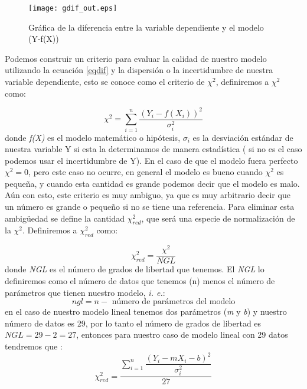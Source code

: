 \documentclass[12pt,letterpaper]{report}
\begin{document}
\begin{figure}
\begin{center}
\texttt{[image: gdif\_out.eps]} 
\caption{Gráfica de la diferencia entre la variable dependiente y el modelo (Y-f(X))}\label{res}
\end{center}
\end{figure}

Podemos construir un criterio para evaluar la calidad de nuestro modelo utilizando la ecuación  \ref{eqdif} y la dispersión o la incertidumbre de nuestra variable dependiente, esto se conoce como el criterio de  $ \chi^{2}$, definiremos a $ \chi^{2}$ como:

\begin{equation}
\chi^{2}=\sum_{i=1}^{n}\dfrac{(Y_{i}-f(X_{i}))^2}{\sigma_{i}^{2}}
\end{equation}
donde \textit{f(X)} es el modelo matemático o hipótesis, $\sigma_{i}$ es la desviación estándar de nuestra variable Y si esta la determinamos de manera estadística ( si no es el caso podemos usar el incertidumbre de Y). En el caso de que el modelo fuera perfecto $\chi^{2} = 0 $, pero este caso no ocurre, en general el modelo es bueno cuando $\chi^{2}$ es pequeña, y cuando esta cantidad es grande podemos decir que el modelo es malo. Aún con esto, este criterio es muy ambiguo, ya que es muy arbitrario decir que un número es grande o pequeño si no se tiene una referencia. Para eliminar esta ambigüedad se define la cantidad  $ \chi_{red}^{2}$, que será una especie de normalización de la $\chi^{2}$. Definiremos a $ \chi_{red}^{2}$ como:

\begin{equation}
\chi_{red}^{2}=\dfrac{\chi^{2}}{NGL}
\end{equation}
donde \textit{NGL} es el número de grados de libertad que tenemos. El \textit{NGL} lo definiremos como el número de datos que tenemos  (n) menos el número de parámetros que tienen nuestro modelo, \textit{i. e.}:
\begin{equation}
 ngl= n - \text{ número de parámetros del modelo}
 \end{equation} 
en el caso de nuestro modelo lineal tenemos dos parámetros (\textit{m} y \textit{b}) y nuestro número de datos es 29, por lo tanto el número de grados de libertad es $NGL = 29 - 2 = 27 $, entonces para nuestro caso de modelo lineal con 29 datos tendremos que :
\begin{equation}
\chi_{red}^{2}=\dfrac{\displaystyle\sum_{i=1}^{n}\dfrac{(Y_{i}-mX_{i}-b)^2}{\sigma_{i}^{2}}}{27}
\end{equation}
\end{document}
